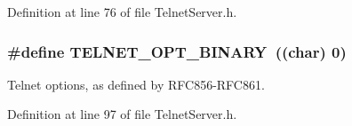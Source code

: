 Definition at line 76 of file Telnet\-Server.\-h.

\hypertarget{group__telnet__server_ga9b82c3af8c3a14bc1f758d79a00e9ee9}{
\subsubsection[{T\-E\-L\-N\-E\-T\-\_\-\-O\-P\-T\-\_\-\-B\-I\-N\-A\-R\-Y}]{\setlength{\rightskip}{0pt plus 5cm}\#define T\-E\-L\-N\-E\-T\-\_\-\-O\-P\-T\-\_\-\-B\-I\-N\-A\-R\-Y~((char) 0)}}\label{group__telnet__server_ga9b82c3af8c3a14bc1f758d79a00e9ee9}
Telnet options, as defined by R\-F\-C856-\/\-R\-F\-C861. 

Definition at line 97 of file Telnet\-Server.\-h.



